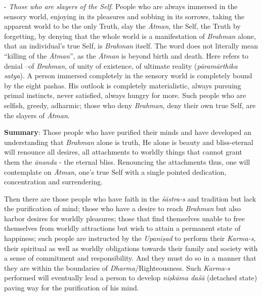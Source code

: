 - \emph{Those who are slayers of the Self}. People who are always immersed in the sensory world, enjoying in its pleasures and sobbing in its sorrows, taking the apparent world to be the only Truth, slay the \emph{Ātman}, the Self, the Truth by forgetting, by denying that the whole world is a manifestation of \emph{Brahman} alone, that an individual's true Self, is \emph{Brahman} itself. The word  does not literally mean ``killing of the \emph{Ātman}'', as the \emph{Ātman} is beyond birth and death. Here  refers to denial --of \emph{Brahman}, of unity of existence, of ultimate reality (\emph{pāramārthika satya}). A person immersed completely in the sensory world is completely bound by the eight pashas. His outlook is completely materialistic, always pursuing primal instincts, never satisfied, always hungry for more. Such people who are selfish, greedy, adharmic; those who deny \emph{Brahman}, deny their own true Self, are the slayers of \emph{Ātman}.

\textbf{Summary}: Those people who have purified their minds and have developed an understanding that \emph{Brahman} alone is truth, He alone is beauty and bliss-eternal will renounce all desires, all attachments to worldly things that cannot grant them the \emph{ānanda} - the eternal bliss. Renouncing the attachments thus, one will contemplate on \emph{Ātman}, one's true Self with a single pointed dedication, concentration and surrendering.

Then there are those people who have faith in the \emph{śāstra-s} and tradition but lack the purification of mind; those who have a desire to reach \emph{Brahman} but also harbor desires for worldly pleasures; those that find themselves unable to free themselves from worldly attractions but wish to attain a permanent state of happiness; such people are instructed by the \emph{Upaniṣad} to perform their \emph{Karma-s}, their spiritual as well as worldly obligations towards their family and society with a sense of commitment and responsibility. And they must do so in a manner that they are within the boundaries of \emph{Dharma}/Righteousness. Such \emph{Karma-s} performed will eventually lead a person to develop \emph{niṣkāma daśā} (detached state) paving way for the purification of his mind.

